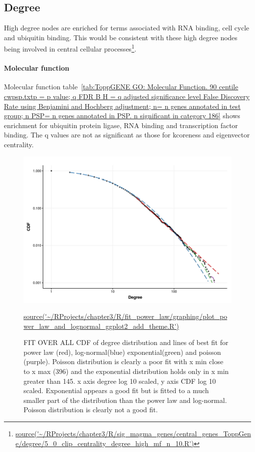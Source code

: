 \subsection{Degree}
High degree nodes are enriched for terms associated with RNA binding, cell cycle and ubiquitin binding. This would be consistent with these high degree nodes being involved in central cellular processes\footnote{\url{source('~/RProjects/chapter3/R/sig_magma_genes/central_genes_ToppGene/degree/5_0_clip_centrality_degree_high_mf_n_10.R')}}.

\paragraph{Molecular function}
Molecular function table~\ref{tab:ToppGENE GO: Molecular Function. 90 centile cwpsp.txtp = p value; q FDR B H = q adjusted significance level False Discovery Rate using Benjamini and Hochberg adjustment; n= n genes annotated in test group; n PSP= n genes annotated in PSP. n significant in category 186} shows enrichment for ubiquitin protein ligase, RNA binding and transcription factor binding. The q values are not as significant as those for kcoreness and eigenvector centrality.






\clearpage
\begin{figure}
    \centering
    \includegraphics[width=\textwidth]{images/chapter3/poweRlaw/RPlot_plot_powerlaw_xmin_set_for_each_distribution_add_theme.png}
    \caption{FIT OVER ALL CDF of degree distribution and lines of best fit for power law (red), log-normal(blue) exponential(green) and poisson (purple). Poisson distribution is clearly a poor fit with x min close to x max (396) and the exponential distribution holds only in x min greater than 145. x axis degree log 10 scaled, y axis CDF log 10 scaled. Exponential appears a good fit but is fitted to a much smaller part of the distribution than the power law and log-normal. Poisson distribution is clearly not a good fit.} 
    \small\url{source('~/RProjects/chapter3/R/fit_power_law/graphing/plot_power_law_and_lognormal_ggplot2_add_theme.R')}
    \label{fig:CDF degreel_theme}
\end{figure}



